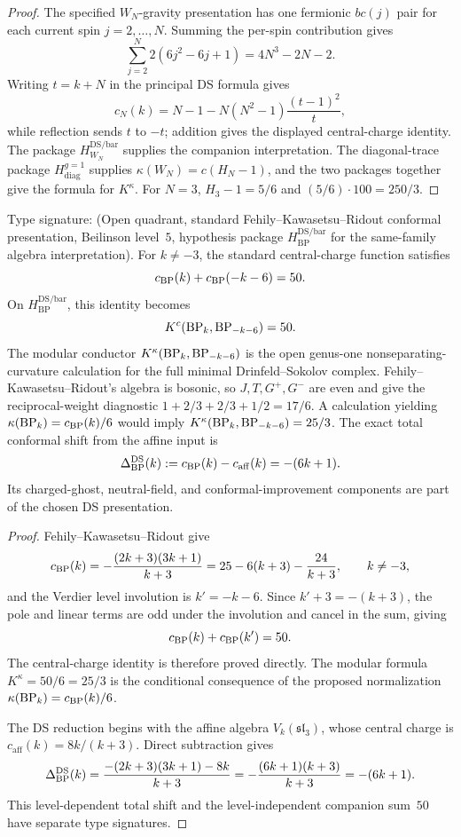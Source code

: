 \begin{proof}
The specified $W_N$-gravity presentation has one fermionic $bc(j)$
pair for each current spin $j=2,\ldots,N$. Summing the per-spin
contribution gives
\[
\sum_{j=2}^{N}2(6j^2-6j+1)
=4N^3-2N-2.
\]
Writing $t=k+N$ in the principal DS formula gives
\[
c_N(k)=N-1-N(N^2-1)\frac{(t-1)^2}{t},
\]
while reflection sends $t$ to $-t$; addition gives the displayed
central-charge identity.  The package $H_{W_N}^{\mathrm{DS/bar}}$
supplies the companion interpretation.  The diagonal-trace package
$H_{\mathrm{diag}}^{g=1}$ supplies
$\kappa(W_N)=c(H_N-1)$, and the two packages together give the formula
for $K^\kappa$. For $N=3$, $H_3-1=5/6$ and
$(5/6)\cdot100=250/3$.
\end{proof}

\begin{corollary}
\label{cor:uc-K-BP}
\ClaimStatusOpen
Type signature: \textup{(}Open quadrant, standard
Fehily--Kawasetsu--Ridout conformal presentation, Beilinson level~$5$,
hypothesis package $H_{\mathrm{BP}}^{\mathrm{DS/bar}}$ for the
same-family algebra interpretation\textup{)}.
For $k\ne-3$, the standard central-charge function
\cite[Eq.~\textup{(}2.2\textup{)}]{FKR20} satisfies
\[
 c_{\mathrm{BP}}(k)+c_{\mathrm{BP}}(-k-6)=50.
\]
On $H_{\mathrm{BP}}^{\mathrm{DS/bar}}$, this identity becomes
\[
K^c(\mathrm{BP}_k,\mathrm{BP}_{-k-6})=50.
\]
The modular conductor $K^\kappa(\mathrm{BP}_k,\mathrm{BP}_{-k-6})$ is the open
genus-one nonseparating-curvature calculation for the full minimal
Drinfeld--Sokolov complex.  Fehily--Kawasetsu--Ridout's algebra is
bosonic, so $J,T,G^+,G^-$ are even and give the reciprocal-weight
diagnostic $1+2/3+2/3+1/2=17/6$.  A calculation yielding
$\kappa(\mathrm{BP}_k)=c_{\mathrm{BP}}(k)/6$ would imply
$K^\kappa(\mathrm{BP}_k,\mathrm{BP}_{-k-6})=25/3$.
The exact total conformal shift from the affine input is
\[
 \Delta^{\mathrm{DS}}_{\mathrm{BP}}(k)
 :=c_{\mathrm{BP}}(k)-c_{\mathrm{aff}}(k)=-(6k+1).
\]
Its charged-ghost, neutral-field, and conformal-improvement components
are part of the chosen DS presentation.
\end{corollary}

\begin{proof}
Fehily--Kawasetsu--Ridout give
\[
 c_{\mathrm{BP}}(k)=-\frac{(2k+3)(3k+1)}{k+3}
 =25-6(k+3)-\frac{24}{k+3},
 \qquad k\ne -3,
\]
and the Verdier level involution is $k'=-k-6$. Since $k'+3=-(k+3)$,
the pole and linear terms are odd under the involution and cancel in
the sum, giving
\[
 c_{\mathrm{BP}}(k)+c_{\mathrm{BP}}(k')=50.
\]
The central-charge identity is therefore proved directly.  The
modular formula $K^\kappa=50/6=25/3$ is the conditional consequence of
the proposed normalization $\kappa(\mathrm{BP}_k)=c_{\mathrm{BP}}(k)/6$.

The DS reduction begins with the affine algebra
$V_k(\mathfrak{sl}_3)$, whose central charge is
$c_{\mathrm{aff}}(k)=8k/(k+3)$. Direct subtraction gives
\[
\Delta^{\mathrm{DS}}_{\mathrm{BP}}(k)
=\frac{-(2k+3)(3k+1)-8k}{k+3}
=-\frac{(6k+1)(k+3)}{k+3}
=-(6k+1).
\]
This level-dependent total shift and the level-independent companion
sum~$50$ have separate type signatures.
\end{proof}

